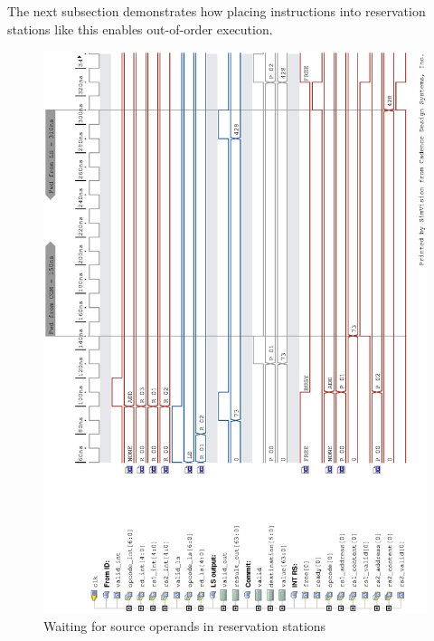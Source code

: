 \documentclass[12pt,a4paper]{article} %
\begin{document}
The next subsection demonstrates how placing instructions into reservation stations like this enables out-of-order execution.


\begin{figure}[!p]
	\centering
	\includegraphics[width=\textwidth, trim = {1.5cm 1.5cm 1.5cm 1.5cm}]{Source/Waveforms/waitingForSourceOps.eps}
	\caption{Waiting for source operands in reservation stations} 
	\label{fig-waiting}
\end{figure}

\newpage
\end{document}
